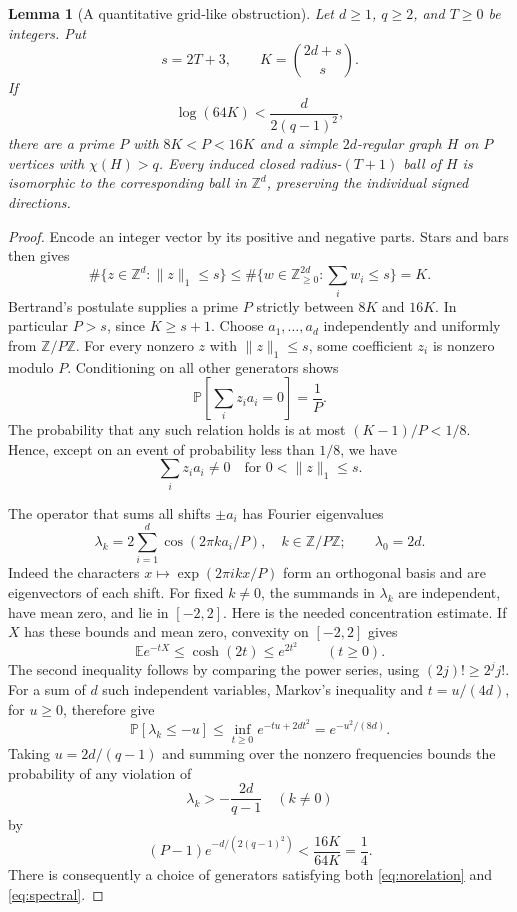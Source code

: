 \documentclass[11pt]{article}
\newtheorem{lemma}[theorem]{Lemma}
\theoremstyle{definition}\newtheorem{definition}[theorem]{Definition}
\theoremstyle{remark}\newtheorem{remark}[theorem]{Remark}
\newcommand{\Z}{\mathbb Z}
\newcommand{\E}{\mathbb E}
\newcommand{\Prob}{\mathbb P}
\newcommand{\norm}[1]{\lVert#1\rVert}
\begin{document}
\begin{lemma}[A quantitative grid-like obstruction]\label{lem:cayley}
Let $d\ge1$, $q\ge2$, and $T\ge0$ be integers. Put
\[
 s=2T+3,\qquad K=\binom{2d+s}{s}.
\]
If
\begin{equation}\label{eq:criterion}
                  \log(64K)<\frac{d}{2(q-1)^2},
\end{equation}
there are a prime $P$ with $8K<P<16K$ and a simple $2d$-regular
graph $H$ on $P$ vertices with $\chi(H)>q$. Every induced closed
radius-$(T+1)$ ball of $H$ is isomorphic to the corresponding ball
in $\Z^d$, preserving the individual signed directions.
\end{lemma}

\begin{proof}
Encode an integer vector by its positive and negative parts.
Stars and bars then gives
\begin{equation}\label{eq:ballcount}
 \#\{z\in\Z^d:\norm{z}_1\le s\}
 \le\#\{w\in\Z_{\ge0}^{2d}:\textstyle\sum_i w_i\le s\}
 =K.
\end{equation}
Bertrand's postulate supplies a prime $P$ strictly between $8K$ and
$16K$. In particular $P>s$, since $K\ge s+1$.
Choose $a_1,\ldots,a_d$ independently and uniformly from $\Z/P\Z$.
For every nonzero $z$ with $\norm{z}_1\le s$, some coefficient $z_i$
is nonzero modulo $P$. Conditioning on all other generators shows
\[
        \Prob\left[\sum_i z_i a_i=0\right]=\frac1P.
\]
The probability that any such relation holds is at most
$(K-1)/P<1/8$. Hence, except on an event of probability less than
$1/8$, we have
\begin{equation}\label{eq:norelation}
       \sum_i z_i a_i\ne0\quad\text{for }0<\norm{z}_1\le s.
\end{equation}

The operator that sums all shifts $\pm a_i$ has Fourier eigenvalues
\[
 \lambda_k=2\sum_{i=1}^d\cos(2\pi k a_i/P),\quad k\in\Z/P\Z;
 \qquad \lambda_0=2d.
\]
Indeed the characters $x\mapsto\exp(2\pi i kx/P)$ form an orthogonal
basis and are eigenvectors of each shift. For fixed $k\ne0$, the
summands in $\lambda_k$ are independent, have mean zero, and lie in
$[-2,2]$. Here is the needed concentration estimate. If $X$ has
these bounds and mean zero, convexity on $[-2,2]$ gives
\[
 \E e^{-tX}\le\cosh(2t)\le e^{2t^2}\qquad(t\ge0).
\]
The second inequality follows by comparing the power series, using
$(2j)!\ge2^j j!$. For a sum of $d$ such independent variables,
Markov's inequality and $t=u/(4d)$, for $u\ge0$, therefore give
\[
 \Prob[\lambda_k\le-u]\le
       \inf_{t\ge0}e^{-tu+2dt^2}=e^{-u^2/(8d)}.
\]
Taking $u=2d/(q-1)$ and summing over the nonzero frequencies bounds
the probability of any violation of
\begin{equation}\label{eq:spectral}
                      \lambda_k>-\frac{2d}{q-1}\quad(k\ne0)
\end{equation}
by
\[
 (P-1)e^{-d/(2(q-1)^2)}<\frac{16K}{64K}=\frac14.
\]
There is consequently a choice of generators satisfying both
\eqref{eq:norelation} and \eqref{eq:spectral}.


\end{proof}
\end{document}
